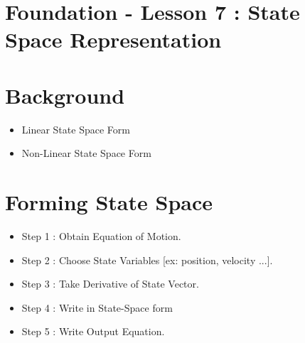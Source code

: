 \documentclass[12pt,a4paper]{article}
\begin{document}
	\section*{\centering Foundation - Lesson 7 : State Space Representation}
	
	
	\section{Background}
	
	\begin{itemize}
		\item Linear State Space Form
	\end{itemize}
	
	\begin{itemize}
		\item Non-Linear State Space Form
	\end{itemize}
	
	\section{Forming State Space}
	\begin{itemize}
		\item Step 1 : Obtain Equation of Motion.
		\item Step 2 : Choose State Variables [ex: position, velocity ...].
		\item Step 3 : Take Derivative of State Vector.
		\item Step 4 : Write in State-Space form
		\item Step 5 : Write Output Equation.
	\end{itemize}
\end{document}
